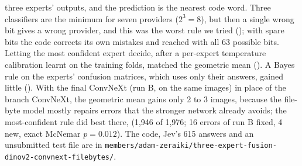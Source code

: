 three experts' outputs, and the prediction is the nearest code word. Three classifiers are the minimum for seven providers ($2^3=8$), but then a single wrong bit gives a wrong provider, and this was the worst rule we tried (); with spare bits the code corrects its own mistakes and reached  with all 63 possible bits. Letting the most confident expert decide, after a per-expert temperature calibration learnt on the training folds, matched the geometric mean (). A Bayes rule on the experts' confusion matrices, which uses only their answers, gained little (). With the final ConvNeXt (run B,  on the same images) in place of the branch ConvNeXt, the geometric mean gains only 2 to 3 images, because the file-byte model mostly repairs errors that the stronger network already avoids; the most-confident rule did best there,  (1{,}946 of 1{,}976; 16 errors of run B fixed, 4 new, exact McNemar $p=0.012$). The code, Jev's 615 answers and an unsubmitted test file are in \nolinkurl{members/adam-zeraiki/three-expert-fusion-dinov2-convnext-filebytes/}.

